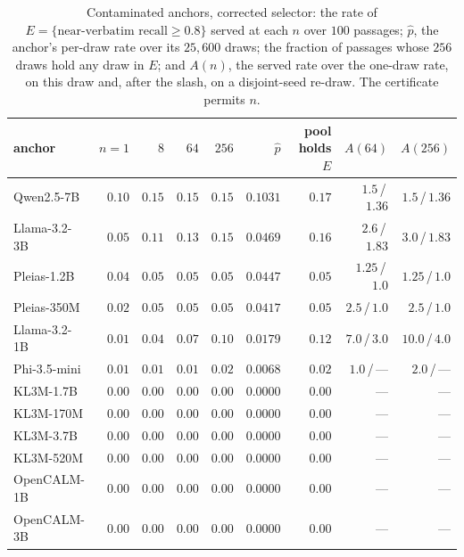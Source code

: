 \begin{table}[t]
\centering\footnotesize
\caption{Contaminated anchors, corrected selector: the rate of $E=\{\text{near-verbatim recall}\ge 0.8\}$
served at each $n$ over $100$ passages; $\hat p$, the anchor's per-draw rate over its $25{,}600$ draws; the
fraction of passages whose $256$ draws hold any draw in $E$; and $A(n)$, the served rate over the one-draw
rate, on this draw and, after the slash, on a disjoint-seed re-draw. The certificate permits $n$.}
\label{tab:contam}
\begin{tabular}{lrrrrrrrr}
\toprule
anchor & $n=1$ & $8$ & $64$ & $256$ & $\hat p$ & pool holds $E$ & $A(64)$ & $A(256)$ \\
\midrule
Qwen2.5-7B & $0.10$ & $0.15$ & $0.15$ & $0.15$ & $0.1031$ & $0.17$ & $1.5$\,/\,$1.36$ & $1.5$\,/\,$1.36$ \\
Llama-3.2-3B & $0.05$ & $0.11$ & $0.13$ & $0.15$ & $0.0469$ & $0.16$ & $2.6$\,/\,$1.83$ & $3.0$\,/\,$1.83$ \\
Pleias-1.2B & $0.04$ & $0.05$ & $0.05$ & $0.05$ & $0.0447$ & $0.05$ & $1.25$\,/\,$1.0$ & $1.25$\,/\,$1.0$ \\
Pleias-350M & $0.02$ & $0.05$ & $0.05$ & $0.05$ & $0.0417$ & $0.05$ & $2.5$\,/\,$1.0$ & $2.5$\,/\,$1.0$ \\
Llama-3.2-1B & $0.01$ & $0.04$ & $0.07$ & $0.10$ & $0.0179$ & $0.12$ & $7.0$\,/\,$3.0$ & $10.0$\,/\,$4.0$ \\
Phi-3.5-mini & $0.01$ & $0.01$ & $0.01$ & $0.02$ & $0.0068$ & $0.02$ & $1.0$\,/\,--- & $2.0$\,/\,--- \\
KL3M-1.7B & $0.00$ & $0.00$ & $0.00$ & $0.00$ & $0.0000$ & $0.00$ & --- & --- \\
KL3M-170M & $0.00$ & $0.00$ & $0.00$ & $0.00$ & $0.0000$ & $0.00$ & --- & --- \\
KL3M-3.7B & $0.00$ & $0.00$ & $0.00$ & $0.00$ & $0.0000$ & $0.00$ & --- & --- \\
KL3M-520M & $0.00$ & $0.00$ & $0.00$ & $0.00$ & $0.0000$ & $0.00$ & --- & --- \\
OpenCALM-1B & $0.00$ & $0.00$ & $0.00$ & $0.00$ & $0.0000$ & $0.00$ & --- & --- \\
OpenCALM-3B & $0.00$ & $0.00$ & $0.00$ & $0.00$ & $0.0000$ & $0.00$ & --- & --- \\
\bottomrule
\end{tabular}
\end{table}

